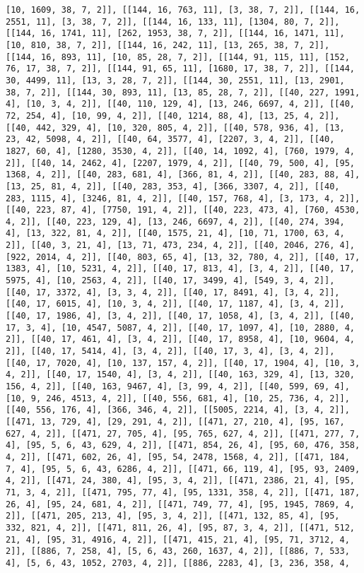 \documentclass[12pt,fleqn]{article}\usepackage{../../common}
\begin{document}
\begin{verbatim}
[10, 1609, 38, 7, 2]], [[144, 16, 763, 11], [3, 38, 7, 2]], [[144, 16, 2551, 11], [3, 38, 7, 2]], [[144, 16, 133, 11], [1304, 80, 7, 2]], [[144, 16, 1741, 11], [262, 1953, 38, 7, 2]], [[144, 16, 1471, 11], [10, 810, 38, 7, 2]], [[144, 16, 242, 11], [13, 265, 38, 7, 2]], [[144, 16, 893, 11], [10, 85, 28, 7, 2]], [[144, 91, 115, 11], [152, 76, 17, 38, 7, 2]], [[144, 91, 65, 11], [1680, 17, 38, 7, 2]], [[144, 30, 4499, 11], [13, 3, 28, 7, 2]], [[144, 30, 2551, 11], [13, 2901, 38, 7, 2]], [[144, 30, 893, 11], [13, 85, 28, 7, 2]], [[40, 227, 1991, 4], [10, 3, 4, 2]], [[40, 110, 129, 4], [13, 246, 6697, 4, 2]], [[40, 72, 254, 4], [10, 99, 4, 2]], [[40, 1214, 88, 4], [13, 25, 4, 2]], [[40, 442, 329, 4], [10, 320, 805, 4, 2]], [[40, 578, 936, 4], [13, 23, 42, 5098, 4, 2]], [[40, 64, 3577, 4], [2207, 3, 4, 2]], [[40, 1827, 60, 4], [1280, 3530, 4, 2]], [[40, 14, 1092, 4], [760, 1979, 4, 2]], [[40, 14, 2462, 4], [2207, 1979, 4, 2]], [[40, 79, 500, 4], [95, 1368, 4, 2]], [[40, 283, 681, 4], [366, 81, 4, 2]], [[40, 283, 88, 4], [13, 25, 81, 4, 2]], [[40, 283, 353, 4], [366, 3307, 4, 2]], [[40, 283, 1115, 4], [3246, 81, 4, 2]], [[40, 157, 768, 4], [3, 173, 4, 2]], [[40, 223, 87, 4], [7750, 191, 4, 2]], [[40, 223, 473, 4], [760, 4530, 4, 2]], [[40, 223, 129, 4], [13, 246, 6697, 4, 2]], [[40, 274, 394, 4], [13, 322, 81, 4, 2]], [[40, 1575, 21, 4], [10, 71, 1700, 63, 4, 2]], [[40, 3, 21, 4], [13, 71, 473, 234, 4, 2]], [[40, 2046, 276, 4], [922, 2014, 4, 2]], [[40, 803, 65, 4], [13, 32, 780, 4, 2]], [[40, 17, 1383, 4], [10, 5231, 4, 2]], [[40, 17, 813, 4], [3, 4, 2]], [[40, 17, 5975, 4], [10, 2563, 4, 2]], [[40, 17, 3499, 4], [549, 3, 4, 2]], [[40, 17, 3372, 4], [3, 3, 4, 2]], [[40, 17, 8491, 4], [3, 4, 2]], [[40, 17, 6015, 4], [10, 3, 4, 2]], [[40, 17, 1187, 4], [3, 4, 2]], [[40, 17, 1986, 4], [3, 4, 2]], [[40, 17, 1058, 4], [3, 4, 2]], [[40, 17, 3, 4], [10, 4547, 5087, 4, 2]], [[40, 17, 1097, 4], [10, 2880, 4, 2]], [[40, 17, 461, 4], [3, 4, 2]], [[40, 17, 8958, 4], [10, 9604, 4, 2]], [[40, 17, 5414, 4], [3, 4, 2]], [[40, 17, 3, 4], [3, 4, 2]], [[40, 17, 7020, 4], [10, 137, 157, 4, 2]], [[40, 17, 1904, 4], [10, 3, 4, 2]], [[40, 17, 1540, 4], [3, 4, 2]], [[40, 163, 329, 4], [13, 320, 156, 4, 2]], [[40, 163, 9467, 4], [3, 99, 4, 2]], [[40, 599, 69, 4], [10, 9, 246, 4513, 4, 2]], [[40, 556, 681, 4], [10, 25, 736, 4, 2]], [[40, 556, 176, 4], [366, 346, 4, 2]], [[5005, 2214, 4], [3, 4, 2]], [[471, 13, 729, 4], [29, 291, 4, 2]], [[471, 27, 210, 4], [95, 167, 627, 4, 2]], [[471, 27, 705, 4], [95, 765, 627, 4, 2]], [[471, 277, 7, 4], [95, 5, 6, 43, 629, 4, 2]], [[471, 854, 26, 4], [95, 60, 476, 358, 4, 2]], [[471, 602, 26, 4], [95, 54, 2478, 1568, 4, 2]], [[471, 184, 7, 4], [95, 5, 6, 43, 6286, 4, 2]], [[471, 66, 119, 4], [95, 93, 2409, 4, 2]], [[471, 24, 380, 4], [95, 3, 4, 2]], [[471, 2386, 21, 4], [95, 71, 3, 4, 2]], [[471, 795, 77, 4], [95, 1331, 358, 4, 2]], [[471, 187, 26, 4], [95, 24, 681, 4, 2]], [[471, 749, 77, 4], [95, 1945, 7869, 4, 2]], [[471, 205, 213, 4], [95, 3, 4, 2]], [[471, 132, 85, 4], [95, 332, 821, 4, 2]], [[471, 811, 26, 4], [95, 87, 3, 4, 2]], [[471, 512, 21, 4], [95, 31, 4916, 4, 2]], [[471, 415, 21, 4], [95, 71, 3712, 4, 2]], [[886, 7, 258, 4], [5, 6, 43, 260, 1637, 4, 2]], [[886, 7, 533, 4], [5, 6, 43, 1052, 2703, 4, 2]], [[886, 2283, 4], [3, 236, 358, 4, 
\end{verbatim}
\end{document}
